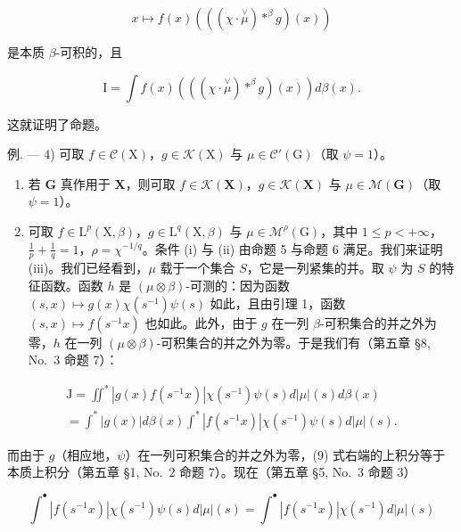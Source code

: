 \[
x \mapsto f (x) \left(\left((\chi \cdot \stackrel {\vee} {\mu}) * ^ {\beta} g\right) (x)\right)
\]

是本质 \(\beta\)-可积的，且

\[
\mathrm{I} = \int f (x) \left(\left(\left(\chi \cdot \stackrel {\vee} {\mu}\right) * ^ {\beta} g\right) (x)\right) d \beta (x).
\]

这就证明了命题。

例. --- 4) 可取 \(f \in \mathcal{C}(\mathrm{X})\)，\(g \in \mathcal{K}(\mathrm{X})\) 与 \(\mu \in \mathcal{C}'(\mathrm{G})\)（取 \(\psi = 1\)）。

\begin{enumerate}
\def\labelenumi{\arabic{enumi})}
\setcounter{enumi}{4}
\item
  若 \(\mathbf{G}\) 真作用于 \(\mathbf{X}\)，则可取 \(f \in \mathcal{K}(\mathbf{X})\)，\(g \in \mathcal{K}(\mathbf{X})\) 与 \(\mu \in \mathcal{M}(\mathbf{G})\)（取 \(\psi = 1\)）。
\item
  可取 \(f \in \mathrm{L}^p(\mathrm{X},\beta)\)，\(g \in \mathrm{L}^q(\mathrm{X},\beta)\) 与 \(\mu \in \mathcal{M}^\rho(\mathrm{G})\)，其中 \(1 \leqslant p < +\infty\)，\(\frac{1}{p} + \frac{1}{q} = 1\)，\(\rho = \chi^{-1/q}\)。条件 (i) 与 (ii) 由命题 5 与命题 6 满足。我们来证明 (iii)。我们已经看到，\(\mu\) 载于一个集合 \(S\)，它是一列紧集的并。取 \(\psi\) 为 \(S\) 的特征函数。函数 \(h\) 是 \((\mu \otimes \beta)\)-可测的：因为函数 \((s,x) \mapsto g(x)\chi(s^{-1})\psi(s)\) 如此，且由引理 1，函数 \((s,x) \mapsto f(s^{-1}x)\) 也如此。此外，由于 \(g\) 在一列 \(\beta\)-可积集合的并之外为零，\(h\) 在一列 \((\mu \otimes \beta)\)-可积集合的并之外为零。于是我们有（第五章 §8, No.~3 命题 7）：
\end{enumerate}

\[
\begin{array}{l} \mathrm{J} = \iint^ {*} | g (x) f (s ^ {- 1} x) | \chi (s ^ {- 1}) \psi (s) d | \mu | (s) d \beta (x) \\ = \int^ {*} | g (x) | d \beta (x) \int^ {*} | f (s ^ {- 1} x) | \chi (s ^ {- 1}) \psi (s) d | \mu | (s). \end{array}\tag{9}
\]

而由于 \(g\)（相应地，\(\psi\)）在一列可积集合的并之外为零，(9) 式右端的上积分等于本质上积分（第五章 §1, No.~2 命题 7）。现在（第五章 §5, No.~3 命题 3）

\[
\int^ {\bullet} | f (s ^ {- 1} x) | \chi (s ^ {- 1}) \psi (s) d | \mu | (s) = \int^ {\bullet} | f (s ^ {- 1} x) | \chi (s ^ {- 1}) d | \mu | (s)
\]

